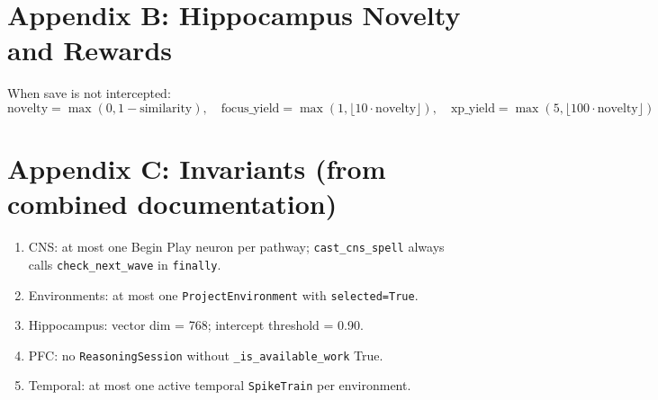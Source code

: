 \documentclass[11pt]{article}
\begin{document}
	\section{Appendix B: Hippocampus Novelty and Rewards}
	When save is not intercepted:
	$$
	\text{novelty} = \max(0, 1 - \text{similarity}), \quad
	\text{focus\_yield} = \max\left(1, \lfloor 10 \cdot \text{novelty} \rfloor\right), \quad
	\text{xp\_yield} = \max\left(5, \lfloor 100 \cdot \text{novelty} \rfloor\right)
	$$
	\cite{talosHippocampus,talosCombined}

	\section{Appendix C: Invariants (from combined documentation)}
	\begin{enumerate}
		\item CNS: at most one Begin Play neuron per pathway; \texttt{cast\_cns\_spell} always calls \texttt{check\_next\_wave} in \texttt{finally}.
		\item Environments: at most one \texttt{ProjectEnvironment} with \texttt{selected=True}.
		\item Hippocampus: vector dim = 768; intercept threshold = 0.90.
		\item PFC: no \texttt{ReasoningSession} without \texttt{\_is\_available\_work} True.
		\item Temporal: at most one active temporal \texttt{SpikeTrain} per environment.
	\end{enumerate}
	\cite{talosCombined}
\end{document}
